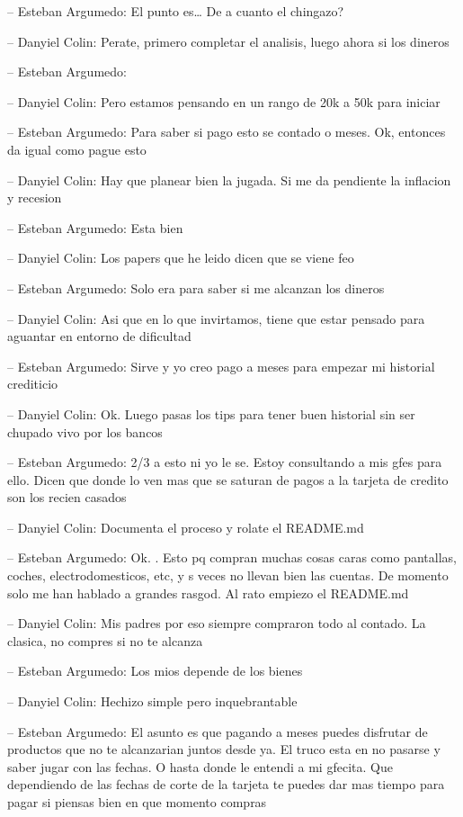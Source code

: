 -- Esteban Argumedo: El punto es\ldots{} De a cuanto el chingazo?

-- Danyiel Colin: Perate, primero completar el analisis, luego ahora si
los dineros

-- Esteban Argumedo:

-- Danyiel Colin: Pero estamos pensando en un rango de 20k a 50k para
iniciar

-- Esteban Argumedo: Para saber si pago esto se contado o meses. Ok,
entonces da igual como pague esto

-- Danyiel Colin: Hay que planear bien la jugada. Si me da pendiente la
inflacion y recesion

-- Esteban Argumedo: Esta bien

-- Danyiel Colin: Los papers que he leido dicen que se viene feo

-- Esteban Argumedo: Solo era para saber si me alcanzan los dineros

-- Danyiel Colin: Asi que en lo que invirtamos, tiene que estar pensado
para aguantar en entorno de dificultad

-- Esteban Argumedo: Sirve y yo creo pago a meses para empezar mi
historial crediticio

-- Danyiel Colin: Ok. Luego pasas los tips para tener buen historial sin
ser chupado vivo por los bancos

-- Esteban Argumedo: 2/3 a esto ni yo le se. Estoy consultando a mis
gfes para ello. Dicen que donde lo ven mas que se saturan de pagos a la
tarjeta de credito son los recien casados

-- Danyiel Colin: Documenta el proceso y rolate el README.md

-- Esteban Argumedo: Ok. . Esto pq compran muchas cosas caras como
pantallas, coches, electrodomesticos, etc, y s veces no llevan bien las
cuentas. De momento solo me han hablado a grandes rasgod. Al rato
empiezo el README.md

-- Danyiel Colin: Mis padres por eso siempre compraron todo al contado.
La clasica, no compres si no te alcanza

-- Esteban Argumedo: Los mios depende de los bienes

-- Danyiel Colin: Hechizo simple pero inquebrantable

-- Esteban Argumedo: El asunto es que pagando a meses puedes disfrutar
de productos que no te alcanzarian juntos desde ya. El truco esta en no
pasarse y saber jugar con las fechas. O hasta donde le entendi a mi
gfecita. Que dependiendo de las fechas de corte de la tarjeta te puedes
dar mas tiempo para pagar si piensas bien en que momento compras

